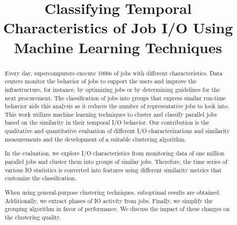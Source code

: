 \documentclass{jhps}
\begin{document}


\title{Classifying Temporal Characteristics of Job I/O Using Machine Learning Techniques}


\maketitle

\begin{abstract}
Every day, supercomputers execute 1000s of jobs with different characteristics.
Data centers monitor the behavior of jobs to support the users and improve the infrastructure, for instance, by optimizing jobs or by determining guidelines for the next procurement.
The classification of jobs into groups that express similar run-time behavior aids this analysis as it reduces the number of representative jobs to look into.
This work utilizes machine learning techniques to cluster and classify parallel jobs based on the similarity in their temporal I/O behavior.
Our contribution is the qualitative and quantitative evaluation of different I/O characterizations and similarity measurements and the development of a suitable clustering algorithm.

In the evaluation, we explore I/O characteristics from monitoring data of one million parallel jobs and cluster them into groups of similar jobs.
Therefore, the time series of various IO statistics is converted into features using different similarity metrics that customize the classification.

When using general-purpose clustering techniques, suboptimal results are obtained.
Additionally, we extract phases of IO activity from jobs.
Finally, we simplify the grouping algorithm in favor of performance.
We discuss the impact of these changes on the clustering quality.
\end{abstract}
\end{document}
